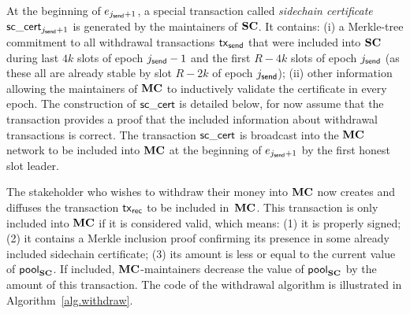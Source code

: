    At the beginning of $e_{j_{\mathsf{send}}+1}$, a special transaction called
    \emph{sidechain certificate
    $\mathsf{sc\_cert}_{j_{\mathsf{send}}+1}$} is generated by the maintainers of $\mathbf{SC}$.
    It contains:
        (i) a Merkle-tree commitment to all withdrawal transactions $\mathsf{tx}_{\mathsf{send}}$ that were
        included into $\mathbf{SC}$ during last
        $4k$ slots of epoch $j_{\mathsf{send}}-1$ and
        the first
        $R-4k$ slots of epoch $j_{\mathsf{send}}$ (as these all are already stable by slot
        $R-2k$ of epoch $j_{\mathsf{send}}$);
        (ii) other information allowing the maintainers of $\mathbf{MC}$ to
        inductively validate the certificate in every epoch.
    The construction of $\mathsf{sc\_cert}$ is detailed  below, for now  assume
    that the transaction provides a proof that the included information about
    withdrawal transactions is correct.
    The transaction $\mathsf{sc\_cert}$ is broadcast into the
    $\mathbf{MC}$ network to be
    included into $\mathbf{MC}$ at the beginning of $e_{j_{\mathsf{send}}+1}$ by the first honest
    slot leader.

    The stakeholder who wishes to withdraw their money into $\mathbf{MC}$ now creates
    and diffuses the transaction $\mathsf{tx}_{\mathsf{rec}}$ to be included in~$\mathbf{MC}$.
    This transaction is only included into $\mathbf{MC}$ if it is considered valid,
    which means:
    (1) it is properly signed;
    (2) it contains a Merkle inclusion proof confirming its presence in some
    already included sidechain certificate;
    (3) its amount is less or equal to the current value of $\mathsf{pool}_{\mathbf{SC}}$.
    If included, $\mathbf{MC}$-maintainers decrease the value of $\mathsf{pool}_{\mathbf{SC}}$ by the
    amount of this transaction.
The code of the withdrawal algorithm is illustrated in
Algorithm~\ref{alg.withdraw}.

